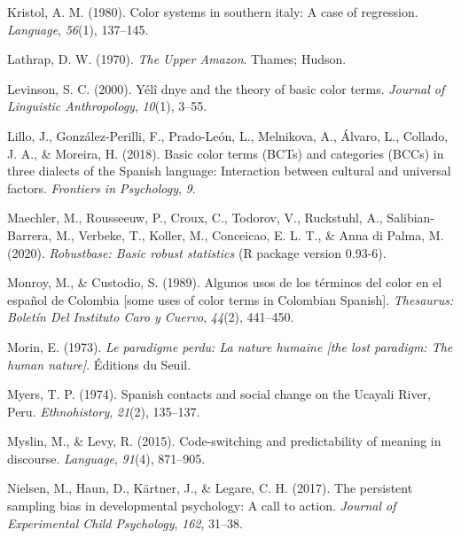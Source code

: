 \documentclass[
  ,apa7,floatsintext]{apa6}
\newlength{\cslhangindent}
\newlength{\cslentryspacingunit} %
\newenvironment{CSLReferences}[2] %
 {%
  \setlength{\parindent}{0pt}
  \ifodd #1
  \let\oldpar\par
  \def\par{\hangindent=\cslhangindent\oldpar}
  \fi
  \setlength{\parskip}{#2\cslentryspacingunit}
 }%
 {}
\begin{document}
\begin{CSLReferences}{1}{0}
\leavevmode{}%
Kristol, A. M. (1980). Color systems in southern italy: A case of regression. \emph{Language}, \emph{56}(1), 137--145.

\leavevmode{}%
Lathrap, D. W. (1970). \emph{The {U}pper {A}mazon}. Thames; Hudson.

\leavevmode{}%
Levinson, S. C. (2000). Yélî dnye and the theory of basic color terms. \emph{Journal of Linguistic Anthropology}, \emph{10}(1), 3--55.

\leavevmode{}%
Lillo, J., González-Perilli, F., Prado-León, L., Melnikova, A., Álvaro, L., Collado, J. A., \& Moreira, H. (2018). Basic color terms (BCTs) and categories (BCCs) in three dialects of the {S}panish language: Interaction between cultural and universal factors. \emph{Frontiers in Psychology}, \emph{9}.

\leavevmode{}%
Maechler, M., Rousseeuw, P., Croux, C., Todorov, V., Ruckstuhl, A., Salibian-Barrera, M., Verbeke, T., Koller, M., Conceicao, E. L. T., \& Anna di Palma, M. (2020). \emph{Robustbase: Basic robust statistics} (R package version 0.93-6).

\leavevmode{}%
Monroy, M., \& Custodio, S. (1989). Algunos usos de los t{é}rminos del color en el espa{ñ}ol de {C}olombia {[}some uses of color terms in {C}olombian {S}panish{]}. \emph{Thesaurus: Bolet{í}n Del Instituto Caro y Cuervo}, \emph{44}(2), 441--450.

\leavevmode{}%
Morin, E. (1973). \emph{Le paradigme perdu: La nature humaine {[}the lost paradigm: The human nature{]}}. {É}ditions du Seuil.

\leavevmode{}%
Myers, T. P. (1974). {S}panish contacts and social change on the {U}cayali {R}iver, {P}eru. \emph{Ethnohistory}, \emph{21}(2), 135--137.

\leavevmode{}%
Myslin, M., \& Levy, R. (2015). Code-switching and predictability of meaning in discourse. \emph{Language}, \emph{91}(4), 871--905.

\leavevmode{}%
Nielsen, M., Haun, D., Kärtner, J., \& Legare, C. H. (2017). The persistent sampling bias in developmental psychology: A call to action. \emph{Journal of Experimental Child Psychology}, \emph{162}, 31--38.


\end{CSLReferences}
\end{document}
